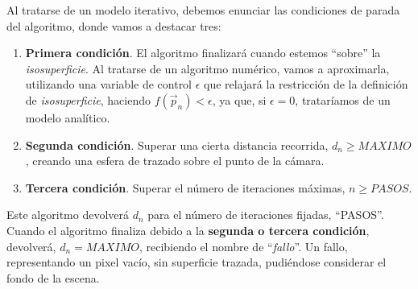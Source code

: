 Al tratarse de un modelo iterativo, debemos enunciar las condiciones de parada del algoritmo, donde vamos a destacar tres:
\begin{enumerate}
    \item \textbf{Primera condición}. El algoritmo finalizará cuando estemos \enquote{sobre} la \textit{isosuperficie}. Al tratarse de un algoritmo numérico, vamos a aproximarla, utilizando una variable de control \(\epsilon\) que relajará la restricción de la definición de  \textit{isosuperficie}, haciendo \(f(\Vec{p}_n) < \epsilon\), ya que, si \(\epsilon = 0\), trataríamos de un modelo analítico.
    \item \textbf{Segunda condición}. Superar una cierta distancia recorrida, \(d_{n}\ge MAXIMO\), creando una esfera de trazado sobre el punto de la cámara.
    \item \textbf{Tercera condición}. Superar el número de iteraciones máximas, \(n \ge PASOS\).
\end{enumerate}
Este algoritmo devolverá \(d_n\) para el número de iteraciones fijadas, \enquote{PASOS}. Cuando el algoritmo finaliza debido a la \textbf{segunda o tercera condición}, devolverá, \(d_n=MAXIMO\), recibiendo el nombre de \enquote{\textit{fallo}}. Un fallo, representando un pixel vacío, sin superficie trazada, pudiéndose considerar el fondo de la escena.

